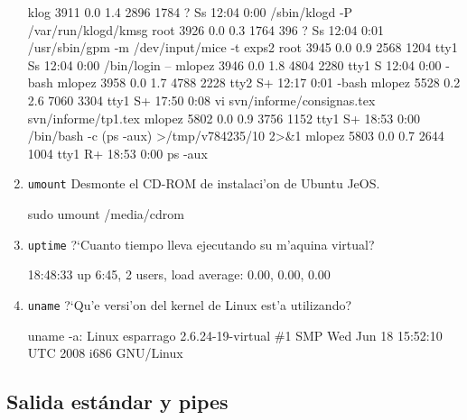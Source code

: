 \begin{enumerate}
\begin{lastTwo}
klog      3911  0.0  1.4   2896  1784 ?        Ss   12:04   0:00 /sbin/klogd -P /var/run/klogd/kmsg
root      3926  0.0  0.3   1764   396 ?        Ss   12:04   0:01 /usr/sbin/gpm -m /dev/input/mice -t exps2
root      3945  0.0  0.9   2568  1204 tty1     Ss   12:04   0:00 /bin/login --       
mlopez    3946  0.0  1.8   4804  2280 tty1     S    12:04   0:00 -bash
mlopez    3958  0.0  1.7   4788  2228 tty2     S+   12:17   0:01 -bash
mlopez    5528  0.2  2.6   7060  3304 tty1     S+   17:50   0:08 vi svn/informe/consignas.tex svn/informe/tp1.tex
mlopez    5802  0.0  0.9   3756  1152 tty1     S+   18:53   0:00 /bin/bash -c (ps -aux) >/tmp/v784235/10 2>&1
mlopez    5803  0.0  0.7   2644  1004 tty1     R+   18:53   0:00 ps -aux
\end{lastTwo}

\item \texttt{umount} Desmonte el CD-ROM de instalaci'on de Ubuntu JeOS.

\begin{lastTwo}
sudo umount /media/cdrom
\end{lastTwo}

\item \texttt{uptime} ?`Cuanto tiempo lleva ejecutando su m'aquina virtual?

\begin{lastTwo}
18:48:33 up  6:45,  2 users,  load average: 0.00, 0.00, 0.00
\end{lastTwo}

\item \texttt{uname} ?`Qu'e versi'on del kernel de Linux est'a utilizando?

\begin{lastTwo}
uname -a:  Linux esparrago 2.6.24-19-virtual \#1 SMP Wed Jun 18 15:52:10 UTC 
2008 i686 GNU/Linux
\end{lastTwo}

\end{enumerate}

\subsection{Salida est\'andar y pipes}

